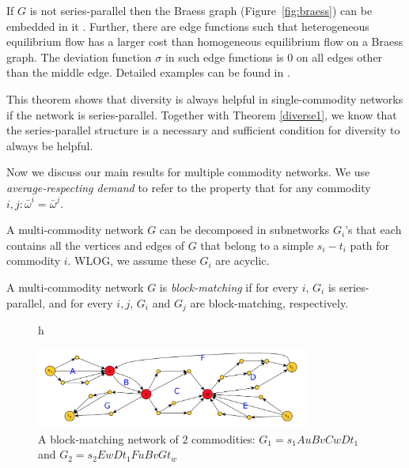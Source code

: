 \begin{proof-sketch}
    If $G$ is not series-parallel then the Braess graph (Figure~\ref{fig:braess}) can be embedded in it \cite{Valdes:1979:RSP:800135.804393}. Further, there are edge functions such that heterogeneous equilibrium flow has a larger cost than homogeneous equilibrium flow on a Braess graph. The deviation function $\sigma$ in such edge functions is $0$ on all edges other than the middle edge. Detailed examples can be found in \cite{ijcai2018-24}.
\end{proof-sketch}

This theorem shows that diversity is always helpful in single-commodity networks if the network is series-parallel. Together with Theorem \ref{diverse1}, we know that the series-parallel structure is a necessary and sufficient condition for diversity to always be helpful.

Now we discuss our main results for multiple commodity networks. We use {\it average-respecting demand} to refer to the property that for any commodity $i,j: \bar{\omega}^i=\bar{\omega}^j$. 

A multi-commodity network $G$ can be decomposed in subnetworks $G_i$'s that each contains all the vertices and edges of $G$ that belong to a simple $s_i-t_i$ path for commodity $i$. WLOG, we assume these $G_i$ are acyclic.

\begin{definition}
    A multi-commodity network $G$ is {\it block-matching} if for every $i$, $G_i$ is series-parallel, and for every $i, j$, $G_i$ and $G_j$ are block-matching, respectively. %
\end{definition}


\begin{figure}{h}
  \begin{center}
    \includegraphics[width=0.8\textwidth]{block.png}
  \end{center}
  \caption{A block-matching network of $2$ commodities: $G_1=s_1 AuBvCwDt_1$ and $G_2=s_2EwDt_1FuBvGt_w$}
\end{figure}


